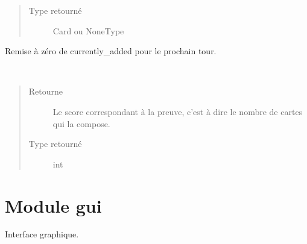 \documentclass[letterpaper,10pt,french]{sphinxmanual}
\begin{document}
\begin{fulllineitems}
\begin{fulllineitems}
\begin{quote}
\begin{description}
\item[{Type retourné}] \leavevmode
Card ou NoneType

\end{description}\end{quote}

\end{fulllineitems}


\begin{fulllineitems}
\label{\detokenize{doc_classe:cards.Proof.reset_added}}
Remise à zéro de currently\_added pour le prochain tour.

\end{fulllineitems}


\begin{fulllineitems}
\label{\detokenize{doc_classe:cards.Proof.score}}~\begin{quote}\begin{description}
\item[{Retourne}] \leavevmode
Le score correspondant à la preuve, c’est à dire le nombre de
cartes qui la compose.

\item[{Type retourné}] \leavevmode
int

\end{description}\end{quote}

\end{fulllineitems}


\end{fulllineitems}



\section{Module gui}
\label{\detokenize{doc_classe:module-gui}}
Interface graphique.
\end{document}
